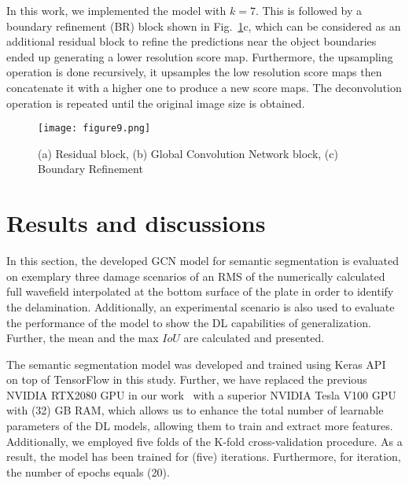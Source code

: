 \documentclass[runningheads]{llncs}
\begin{document}
In this work, we implemented the model with \(k=7\).
This is followed by a boundary refinement (BR) block shown in Fig.~\ref{fig:res_gcn_br}c, which can be considered as an additional residual block to refine the predictions near the object boundaries ended up generating a lower resolution score map. 
Furthermore, the upsampling operation is done recursively, it upsamples the low 
resolution score maps then concatenate it with a higher one to produce a new 
score maps.
The deconvolution operation is repeated until the original image size is 
obtained.
\begin{figure} [ht!]
	\begin{center}
		\texttt{[image: figure9.png]}
	\end{center}
	\caption{(a) Residual block, (b) Global Convolution Network block, (c) 
		Boundary Refinement} 
	\label{fig:res_gcn_br}
\end{figure}
\section{Results and discussions}
\label{section:results_and_discussions}
In this section, the developed GCN model for semantic segmentation is evaluated on exemplary three damage scenarios of an RMS of the numerically calculated full wavefield interpolated at the bottom surface of the plate in order to identify the delamination.
Additionally, an experimental scenario is also used to evaluate the performance of the model to show the DL capabilities of generalization.
Further, the mean and the max \(IoU\) are calculated and presented.

The semantic segmentation model was developed and trained using Keras API~\cite{chollet2015keras} on top of TensorFlow in this study.
Further, we have replaced the previous NVIDIA RTX2080 GPU in our work~\cite{Ijjeh2021} with a superior NVIDIA Tesla V100 GPU with (32) GB RAM, which allows us to enhance the total number of learnable parameters of the DL models, allowing them to train and extract more features.
Additionally, we employed five folds of the K-fold cross-validation procedure.
As a result, the model has been trained for (five) iterations.
Furthermore, for iteration, the number of epochs equals (20).
\end{document}
